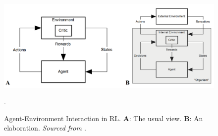 \documentclass[10pt, a4paper]{article}
\begin{document}
\begin{figure}[h]
	\includegraphics[width=\textwidth]{Q4-Internal-External-Environment.png}
	\caption{Agent-Environment Interaction in RL. \textbf{A}: The usual view. \textbf{B}: An elaboration. \textit{Sourced from \cite{chentanez2005intrinsically}}.}.
	\label{fig:Internal-External}

\end{figure}

\newpage

\printbibliography
\end{document}
